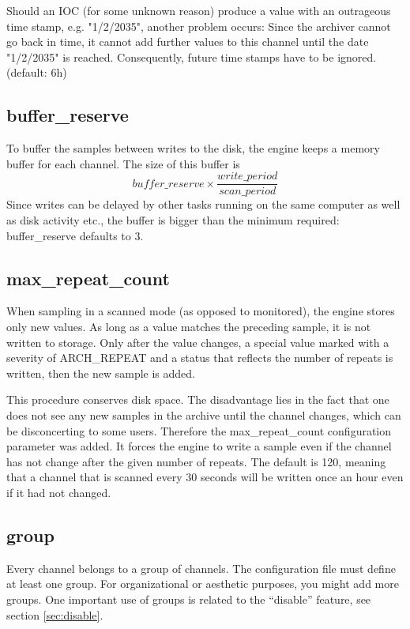 Should an IOC (for some unknown reason) produce a value with an
outrageous time stamp, e.g. "1/2/2035", another problem occurs: Since
the archiver cannot go back in time, it cannot add further values to
this channel until the date "1/2/2035" is reached.  Consequently,
future time stamps have to be ignored. (default: 6h)

\subsection{buffer\_reserve} \label{sec:reserve}
To buffer the samples between writes to the disk, the engine keeps a
memory buffer for each channel. The size of this buffer is
$$ buffer\_reserve \times \frac{write\_period}{scan\_period}
$$ Since writes can be delayed by other tasks running on the same
computer as well as disk activity etc., the buffer is bigger than the
minimum required: buffer\_reserve defaults to 3.

\subsection{max\_repeat\_count} \label{sec:repeats}
When sampling in a scanned mode (as opposed to monitored), the engine
stores only new values. As long as a value matches the preceding
sample, it is not written to storage. Only after the value changes, a
special value marked with a severity of ARCH\_REPEAT and a status that
reflects the number of repeats is written, then the new sample is
added.

This procedure conserves disk space. The disadvantage lies in the fact
that one does not see any new samples in the archive until the
channel changes, which can be disconcerting to some users. Therefore
the max\_repeat\_count configuration parameter was added. It forces
the engine to write a sample even if the channel has not change after
the given number of repeats. The default is 120, meaning that a
channel that is scanned every 30 seconds will be written once an hour
even if it had not changed. 

\subsection{group}
Every channel belongs to a group of channels. The configuration file
must define at least one group. For organizational or aesthetic
purposes, you might add more groups. One important use of groups is
related to the ``disable'' feature, see section \ref{sec:disable}.

